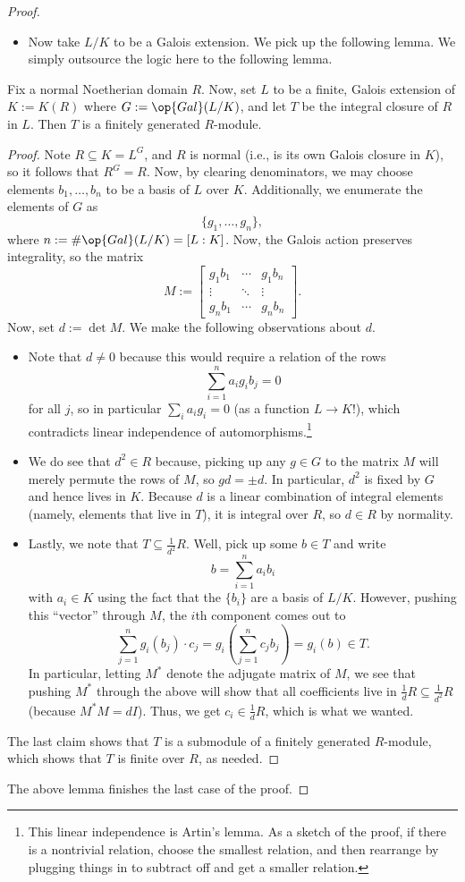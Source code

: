 \documentclass[../notes.tex]{subfiles}
\begin{document}
\begin{proof}
\begin{itemize}
		\item Now take $L/K$ to be a Galois extension. We pick up the following lemma. We simply outsource the logic here to the following lemma.
	\end{itemize}
	\begin{lemma}
		Fix a normal Noetherian domain $R$. Now, set $L$ to be a finite, Galois extension of $K:=K(R)$ where $G:=\op{Gal}(L/K)$, and let $T$ be the integral closure of $R$ in $L$. Then $T$ is a finitely generated $R$-module.
	\end{lemma}
	\begin{proof}
		Note $R\subseteq K=L^G$, and $R$ is normal (i.e., is its own Galois closure in $K$), so it follows that $R^G=R$. Now, by clearing denominators, we may choose elements $b_1,\ldots,b_n$ to be a basis of $L$ over $K$. Additionally, we enumerate the elements of $G$ as
		\[\{g_1,\ldots,g_n\},\]
		where $n:=\#\op{Gal}(L/K)=[L:K]$. Now, the Galois action preserves integrality, so the matrix
		\[M:=\begin{bmatrix}
			g_1b_1 & \cdots & g_1b_n \\
			\vdots & \ddots & \vdots \\
			g_nb_1 & \cdots & g_nb_n
		\end{bmatrix}.\]
		Now, set $d:=\det M$. We make the following observations about $d$.
		\begin{itemize}
			\item Note that $d\ne0$ because this would require a relation of the rows
			\[\sum_{i=1}^na_ig_ib_j=0\]
			for all $j$, so in particular $\sum_ia_ig_i=0$ (as a function $L\to K$!), which contradicts linear independence of automorphisms.\footnote{This linear independence is Artin's lemma. As a sketch of the proof, if there is a nontrivial relation, choose the smallest relation, and then rearrange by plugging things in to subtract off and get a smaller relation.}
			\item We do see that $d^2\in R$ because, picking up any $g\in G$ to the matrix $M$ will merely permute the rows of $M$, so $gd=\pm d$. In particular, $d^2$ is fixed by $G$ and hence lives in $K$. Because $d$ is a linear combination of integral elements (namely, elements that live in $T$), it is integral over $R$, so $d\in R$ by normality.
			\item Lastly, we note that $T\subseteq\frac1{d^2}R$. Well, pick up some $b\in T$ and write
			\[b=\sum_{i=1}^na_ib_i\]
			with $a_i\in K$ using the fact that the $\{b_i\}$ are a basis of $L/K$. However, pushing this ``vector'' through $M$, the $i$th component comes out to
			\[\sum_{j=1}^ng_i(b_j)\cdot c_j=g_i\left(\sum_{j=1}^nc_jb_j\right)=g_i(b)\in T.\]
			In particular, letting $M^*$ denote the adjugate matrix of $M$, we see that pushing $M^*$ through the above will show that all coefficients live in $\frac 1dR\subseteq\frac1{d^2}R$ (because $M^*M=dI$). Thus, we get $c_i\in\frac1dR$, which is what we wanted.
		\end{itemize}
		The last claim shows that $T$ is a submodule of a finitely generated $R$-module, which shows that $T$ is finite over $R$, as needed.
	\end{proof}
	The above lemma finishes the last case of the proof.
\end{proof}
\end{document}

